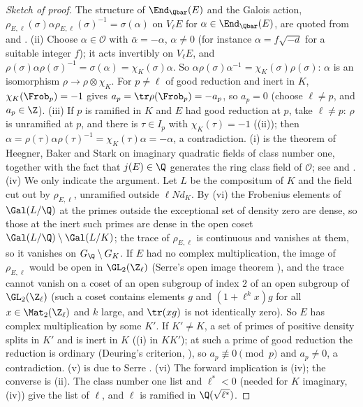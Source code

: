 \begin{proof}[Sketch of proof]
The structure of $\End_{\Qbar}(E)$ and the Galois action, $\rho_{E,\ell}(\sigma)\alpha\rho_{E,\ell}(\sigma)^{-1}=\sigma(\alpha)$ on $V_\ell E$ for $\alpha\in\End_{\Qbar}(E)$,
are quoted from  and \cite[Chapter II, Section 2]{SilvermanATAEC}. (ii) Choose $\alpha\in\mathcal O$ with $\bar\alpha=-\alpha$, $\alpha\ne0$ (for
instance $\alpha=f\sqrt{-d}$ for a suitable integer $f$); it acts invertibly on $V_\ell E$, and $\rho(\sigma)\alpha\rho(\sigma)^{-1}=\sigma(\alpha)=\chi_K(\sigma)\alpha$. So
$\alpha\rho(\sigma)\alpha^{-1}=\chi_K(\sigma)\rho(\sigma)$: $\alpha$ is an isomorphism $\rho\to\rho\otimes\chi_K$. For $p\ne\ell$ of good reduction and inert in $K$,
$\chi_K(\Frob_p)=-1$ gives $a_p=\tr\rho(\Frob_p)=-a_p$, so $a_p=0$ (choose $\ell\ne p$, and $a_p\in\Z$). (iii) If $p$ is ramified in $K$ and $E$ had good reduction
at $p$, take $\ell\ne p$: $\rho$ is unramified at $p$, and there is $\tau\in I_p$ with $\chi_K(\tau)=-1$ ((ii)); then
$\alpha=\rho(\tau)\alpha\rho(\tau)^{-1}=\chi_K(\tau)\alpha=-\alpha$, a contradiction. (i) is the theorem of Heegner, Baker and Stark on imaginary quadratic fields of
class number one, together with the fact that $j(E)\in\Q$ generates the ring class field of $\mathcal O$; see \cite[Chapter II and Appendix A]{SilvermanATAEC} and
\cite[Sections 7, 11 and 12]{Cox}. (iv) We only indicate the argument. Let $L$ be the compositum of $K$ and the field cut out by $\rho_{E,\ell}$, unramified outside $\ell Nd_K$. By
(vi) the Frobenius elements of $\Gal(L/\Q)$ at the primes outside the exceptional set of density zero are dense, so those at the inert
such primes are dense in the open coset $\Gal(L/\Q)\setminus\Gal(L/K)$; the trace of $\rho_{E,\ell}$ is continuous and vanishes at them, so it vanishes on
$G_\Q\setminus G_K$. If $E$ had no complex multiplication, the image of $\rho_{E,\ell}$ would be open in $\GL_2(\Z_\ell)$ (Serre's open image theorem
\cite{Serre72}), and the trace cannot vanish on a coset of an open subgroup of index $2$ of an open subgroup of $\GL_2(\Z_\ell)$ (such a coset contains elements
$g$ and $(1+\ell^kx)g$ for all $x\in\Mat_2(\Z_\ell)$ and $k$ large, and $\tr(xg)$ is not identically zero). So $E$ has complex multiplication by some $K'$. If
$K'\ne K$, a set of primes of positive density splits in $K'$ and is inert in $K$ ((i) in $KK'$); at such a prime of good reduction
the reduction is ordinary (Deuring's criterion, \cite[Section 14]{Cox}), so $a_p\not\equiv0\pmod p$ and $a_p\ne0$, a contradiction. (v) is due to Serre \cite[Section 7]{Serre81}. (vi) The forward implication is
(iv); the converse is (ii). The class number one list and $\ell^*<0$ (needed for $K$ imaginary, (iv)) give the list of $\ell$, and
$\ell$ is ramified in $\Q(\sqrt{\ell^*})$.
\end{proof}

